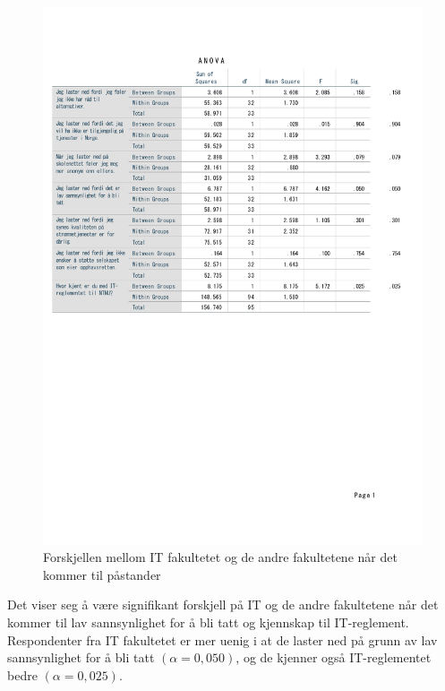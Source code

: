 \begin{figure}[H]
    \centering
    \includegraphics[scale=0.7]{case_1/bilder/fakultet_pastander_anova.pdf}
    \caption[Forskjellen mellom fakultetene på påstander]{Forskjellen mellom IT fakultetet og de andre fakultetene når det kommer til påstander}
    \label{fig:fakultet_pastander_anova}
\end{figure}

Det viser seg å være signifikant forskjell på IT og de andre fakultetene når det kommer til lav sannsynlighet for å bli tatt og kjennskap til IT-reglement. Respondenter fra IT fakultetet er mer uenig i at de laster ned på grunn av lav sannsynlighet for å bli tatt \((\alpha = 0,050)\), og de kjenner også IT-reglementet bedre \((\alpha = 0,025)\). 

